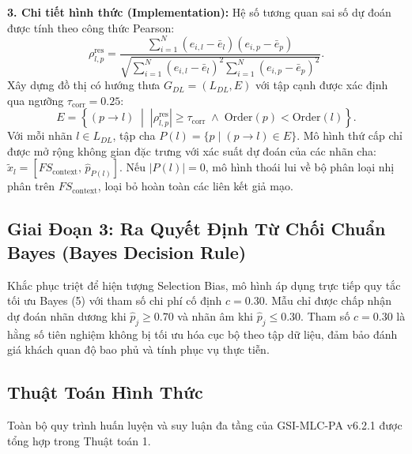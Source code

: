 \documentclass[10pt,a4paper,twoside]{article}
\begin{document}
\vspace{0.3em}
\noindent\textbf{3. Chi tiết hình thức (Implementation):} Hệ số tương quan sai số dự đoán được tính theo công thức Pearson:
\begin{equation}
\rho_{l,p}^{\text{res}} = \frac{\sum_{i=1}^N (e_{i,l} - \bar{e}_l)(e_{i,p} - \bar{e}_p)}{\sqrt{\sum_{i=1}^N (e_{i,l} - \bar{e}_l)^2 \sum_{i=1}^N (e_{i,p} - \bar{e}_p)^2}}.
\end{equation}
Xây dựng đồ thị có hướng thưa $G_{DL} = (L_{DL}, E)$ với tập cạnh được xác định qua ngưỡng $\tau_{\text{corr}} = 0.25$:
\begin{equation}
E = \left\{ (p \to l) \;\middle|\; |\rho_{l,p}^{\text{res}}| \ge \tau_{\text{corr}} \;\land\; \text{Order}(p) < \text{Order}(l) \right\}.
\end{equation}
Với mỗi nhãn $l \in L_{DL}$, tập cha $P(l) = \{p \mid (p \to l) \in E\}$. Mô hình thứ cấp chỉ được mở rộng không gian đặc trưng với xác suất dự đoán của các nhãn cha: $\tilde{x}_l = [FS_{\text{context}}, \, \hat{p}_{P(l)}]$. Nếu $|P(l)| = 0$, mô hình thoái lui về bộ phân loại nhị phân trên $FS_{\text{context}}$, loại bỏ hoàn toàn các liên kết giả mạo.

\subsection{Giai Đoạn 3: Ra Quyết Định Từ Chối Chuẩn Bayes (Bayes Decision Rule)}
Khắc phục triệt để hiện tượng Selection Bias, mô hình áp dụng trực tiếp quy tắc tối ưu Bayes (5) với tham số chi phí cố định $c = 0.30$. Mẫu chỉ được chấp nhận dự đoán nhãn dương khi $\hat{p}_j \ge 0.70$ và nhãn âm khi $\hat{p}_j \le 0.30$. Tham số $c = 0.30$ là hằng số tiên nghiệm không bị tối ưu hóa cục bộ theo tập dữ liệu, đảm bảo đánh giá khách quan độ bao phủ và tính phục vụ thực tiễn.

\subsection{Thuật Toán Hình Thức}
Toàn bộ quy trình huấn luyện và suy luận đa tầng của GSI-MLC-PA v6.2.1 được tổng hợp trong Thuật toán 1.
\end{document}
